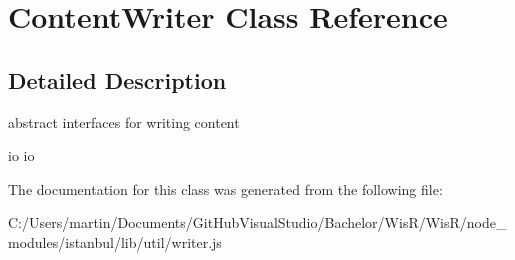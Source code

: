 \hypertarget{class_content_writer}{}\section{Content\+Writer Class Reference}
\label{class_content_writer}


\subsection{Detailed Description}
abstract interfaces for writing content

io  io  

The documentation for this class was generated from the following file\+:\begin{DoxyCompactItemize}
\item 
C\+:/\+Users/martin/\+Documents/\+Git\+Hub\+Visual\+Studio/\+Bachelor/\+Wis\+R/\+Wis\+R/node\+\_\+modules/istanbul/lib/util/writer.\+js\end{DoxyCompactItemize}
